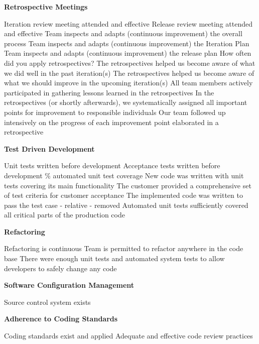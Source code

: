 \begin{appendices}
\textbf{Retrospective Meetings}
\begin{itemize}
	\taa Iteration review meeting attended and effective
	\taa Release review meeting attended and effective
	\taar Team inspects and adapts (continuous improvement) the overall process
	\taar Team inspects and adapts (continuous improvement) the Iteration Plan
	\taar Team inspects and adapts (continuous improvement) the release plan
	\pamr How often did you apply retrospectives? %
	\pamr The retrospectives helped us become aware of what we did well in the past iteration(s)
	\pamr The retrospectives helped us become aware of what we should improve in the upcoming iteration(s)
	\pamr All team members actively participated in gathering lessons learned in the retrospectives
	\pamr In the retrospectives (or shortly afterwards), we systematically assigned all important points for improvement to responsible individuals
	\pamr Our team followed up intensively on the progress of each improvement point elaborated in a retrospective
\end{itemize}

\textbf{Test Driven Development}
\begin{itemize}
	\taa Unit tests written before development
	\taar Acceptance tests written before development
	\% automated unit test coverage
	\pam New code was written with unit tests covering its main functionality
	\pam The customer provided a comprehensive set of test criteria for customer acceptance
	\pam The implemented code was written to pass the test case - relative - removed
	\pamr Automated unit tests sufficiently covered all critical parts of the production code
\end{itemize}

\textbf{Refactoring}
\begin{itemize}
	\taa Refactoring is continuous
	\pamr Team is permitted to refactor anywhere in the code base
	\pamr There were enough unit tests and automated system tests to allow developers to safely change any code
\end{itemize}

\textbf{Software Configuration Management}
\begin{itemize}
	\taa Source control system exists
\end{itemize}

\textbf{Adherence to Coding Standards}
\begin{itemize}
	\taa Coding standards exist and applied
	\taa Adequate and effective code review practices
\end{itemize}


\end{appendices}
